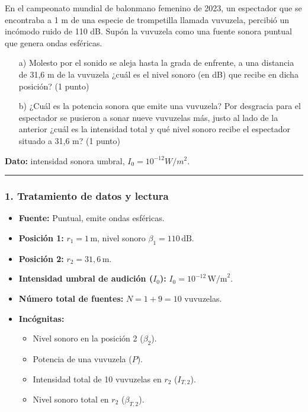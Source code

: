 \begin{cajaenunciado}
En el campeonato mundial de balonmano femenino de 2023, un espectador que se encontraba a 1 m de una especie de trompetilla llamada vuvuzela, percibió un incómodo ruido de 110 dB. Supón la vuvuzela como una fuente sonora puntual que genera ondas esféricas.
\begin{enumerate}
    \item[a)] Molesto por el sonido se aleja hasta la grada de enfrente, a una distancia de 31,6 m de la vuvuzela ¿cuál es el nivel sonoro (en dB) que recibe en dicha posición? (1 punto)
    \item[b)] ¿Cuál es la potencia sonora que emite una vuvuzela? Por desgracia para el espectador se pusieron a sonar nueve vuvuzelas más, justo al lado de la anterior ¿cuál es la intensidad total y qué nivel sonoro recibe el espectador situado a 31,6 m? (1 punto)
\end{enumerate}
\textbf{Dato:} intensidad sonora umbral, $I_{0}=10^{-12}W/m^{2}$.
\end{cajaenunciado}
\hrule

\subsubsection*{1. Tratamiento de datos y lectura}
\begin{itemize}
    \item \textbf{Fuente:} Puntual, emite ondas esféricas.
    \item \textbf{Posición 1:} $r_1 = 1 \, \text{m}$, nivel sonoro $\beta_1 = 110 \, \text{dB}$.
    \item \textbf{Posición 2:} $r_2 = 31,6 \, \text{m}$.
    \item \textbf{Intensidad umbral de audición ($I_0$):} $I_0 = 10^{-12} \, \text{W/m}^2$.
    \item \textbf{Número total de fuentes:} $N = 1+9 = 10$ vuvuzelas.
    \item \textbf{Incógnitas:}
    \begin{itemize}
        \item Nivel sonoro en la posición 2 ($\beta_2$).
        \item Potencia de una vuvuzela ($P$).
        \item Intensidad total de 10 vuvuzelas en $r_2$ ($I_{T,2}$).
        \item Nivel sonoro total en $r_2$ ($\beta_{T,2}$).
    \end{itemize}
\end{itemize}

